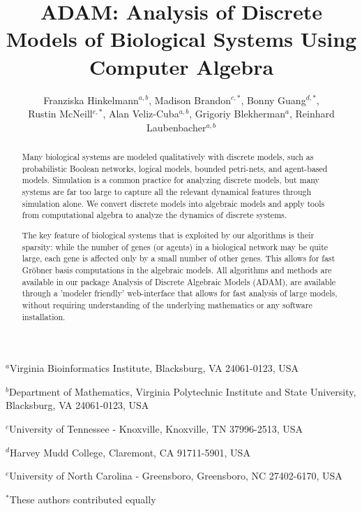 \documentclass[11pt]{amsart}
\title{ADAM:  Analysis of Discrete Models of Biological
Systems Using Computer Algebra}
\author{Franziska Hinkelmann$^{a,b}$,
Madison Brandon$^{c,*}$,
Bonny Guang$^{d,*}$,\\
Rustin McNeill$^{e,*}$,
Alan Veliz-Cuba$^{a,b}$, Grigoriy Blekherman$^{a}$, Reinhard Laubenbacher$^{a,b}$}
\begin{document}
\maketitle
{\footnotesize
     \centerline{$^a$Virginia Bioinformatics Institute, Blacksburg, VA 24061-0123, USA}
}

{\footnotesize
     \centerline{$^b$Department of Mathematics,
      Virginia Polytechnic Institute and State University, Blacksburg, VA 24061-0123, USA}
}

{\footnotesize
     \centerline{$^c$University of Tennessee - Knoxville, Knoxville, TN 37996-2513, USA}
}

{\footnotesize
     \centerline{$^d$Harvey Mudd College, Claremont, CA 91711-5901, USA}
}


{\footnotesize
     \centerline{$^e$University of North Carolina - Greensboro, Greensboro, NC 27402-6170, USA}
}

{\footnotesize
     \centerline{$^*$These authors contributed equally}
}



\begin{abstract}

Many biological systems are modeled qualitatively with discrete models, such as 
probabilistic Boolean networks, logical models, bounded petri-nets, and agent-based models.
Simulation is a common practice for analyzing discrete models, but many systems are far too large
to capture all the relevant dynamical features through simulation alone. We convert discrete models into algebraic models
and apply tools from computational algebra to analyze the dynamics of discrete systems. 

The key feature of biological systems that is exploited by our algorithms is their sparsity: while the number of genes (or agents) in a
biological network may be quite large, each gene is affected only by a small number of other genes. This allows for fast Gr\"{o}bner basis 
computations in the algebraic models.
All algorithms and methods are available in our package  Analysis of Discrete Algebraic Models (ADAM), are available through a 'modeler friendly' web-interface
that allows for fast analysis of large models, without requiring understanding of the underlying mathematics or any software installation.

\end{abstract}
\end{document}
